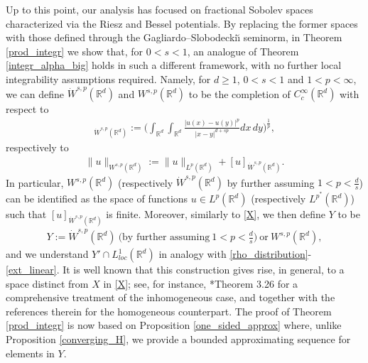 \documentclass[letterpaper, 11pt,  reqno]{amsart}
\theoremstyle{definition}
\theoremstyle{remark}
\numberwithin{equation}{section}
\newcommand{\bbr}{\mathbb{R}}
\newcommand{\R}{{\mathbb R}}
\begin{document}
Up to this point, our analysis has focused on fractional Sobolev spaces characterized via the Riesz and Bessel potentials. By replacing the former spaces with those defined through the Gagliardo--Slobodecki\u{\i}  seminorm,  in Theorem \ref{prod_integr} we show that, for $0<s<1$, an analogue of Theorem \ref{integr_alpha_big} holds in such a different framework, with no further local integrability assumptions required. Namely,
for $d\ge 1$, $0<s<1$ and $1<p<\infty$,  we can define $\dot W^{s,p}(\R^d)$ and $W^{s,p}(\R^d)$  to be the completion of $C^{\infty}_c(\R^d)$ with respect to 
\begin{align*}
[u]_{\dot W^{s,p}(\R^d)}:=\bigg(\int_{\R^d}\int_{\R^d}\frac{|u(x)-u(y)|^p}{|x-y|^{d+sp}}dx\,dy\bigg)^{\frac{1}{p}},
\end{align*}
respectively to
\begin{align}\label{homPbis}
\|u\|_{W^{s,p}(\R^d)}:=\|u\|_{L^p(\R^d)}+[u]_{\dot W^{s,p}(\R^d)}.
\end{align}
In particular, $ W^{s,p}(\R^d)$ (respectively $\dot W^{s,p}(\R^d)$ by further assuming $1<p<\frac{d}{s}$) can be identified as the space of functions $u\in L^{p}(\R^d)$ (respectively $L^{p^*}(\R^d)$) such that $[u]_{\dot W^{s,p}(\R^d)}$ is finite.  
Moreover, similarly to \eqref{X}, we then define $Y$ to be 
\begin{align}\label{X_tilde}
{Y}:= \dot W^{s,p}(\R^d)\ \big(\text{by further assuming}\ 1<p<\tfrac{d}{s}\big)\ \text{or}\ W^{s,p}(\R^d),
	\end{align}
and we understand $Y'\cap L^{1}_{loc}(\R^d)$ in analogy with \eqref{rho_distribution}-\eqref{ext_linear}. 
It is well known that this construction gives rise, in general,  to a space distinct from $X$ in \eqref{X}; see, for instance, \cite{interpolation}*{Theorem 3.26} for a comprehensive treatment of the inhomogeneous case, and \cite{characterisation} together with the references therein for the homogeneous counterpart.
The proof of Theorem \ref{prod_integr} is now based on Proposition \ref{one_sided_approx} where, unlike Proposition \ref{converging_H}, we provide a bounded approximating sequence for elements in $Y$.
\end{document}
